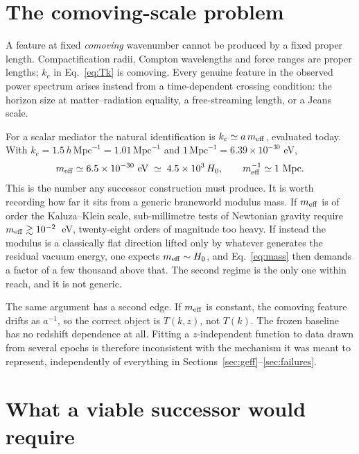 \documentclass[11pt,a4paper]{article}
\newcommand{\hMpc}{h\,\mathrm{Mpc}^{-1}}
\newcommand{\meff}{m_{\rm eff}}
\begin{document}
\section{The comoving-scale problem}\label{sec:comoving}

A feature at fixed \emph{comoving} wavenumber cannot be produced by a fixed proper
length. Compactification radii, Compton wavelengths and force ranges are proper
lengths; $k_c$ in Eq.~\eqref{eq:Tk} is comoving. Every genuine feature in the
observed power spectrum arises instead from a time-dependent crossing condition:
the horizon size at matter--radiation equality, a free-streaming length, or a Jeans
scale.

For a scalar mediator the natural identification is $k_c\simeq a\,\meff$, evaluated
today. With $k_c=1.5\,\hMpc=1.01\,\mathrm{Mpc}^{-1}$ and
$1\,\mathrm{Mpc}^{-1}=6.39\times10^{-30}$ eV,
\begin{equation}
\meff \simeq 6.5\times10^{-30}\ \mathrm{eV}
\;\simeq\; 4.5\times10^{3}\,H_0,
\qquad
\meff^{-1}\simeq1\ \mathrm{Mpc}.
\label{eq:mass}
\end{equation}
This is the number any successor construction must produce. It is worth recording
how far it sits from a generic braneworld modulus mass. If $\meff$ is of order the
Kaluza--Klein scale, sub-millimetre tests of Newtonian gravity require
$\meff\gtrsim10^{-2}$~eV, twenty-eight orders of magnitude too heavy. If instead the
modulus is a classically flat direction lifted only by whatever generates the
residual vacuum energy, one expects $\meff\sim H_0$, and Eq.~\eqref{eq:mass} then
demands a factor of a few thousand above that. The second regime is the only one
within reach, and it is not generic.

The same argument has a second edge. If $\meff$ is constant, the comoving feature
drifts as $a^{-1}$, so the correct object is $T(k,z)$, not $T(k)$. The frozen
baseline has no redshift dependence at all. Fitting a $z$-independent function to
data drawn from several epochs is therefore inconsistent with the mechanism it was
meant to represent, independently of everything in
Sections~\ref{sec:geff}--\ref{sec:failures}.

\section{What a viable successor would require}\label{sec:requirements}
\end{document}
